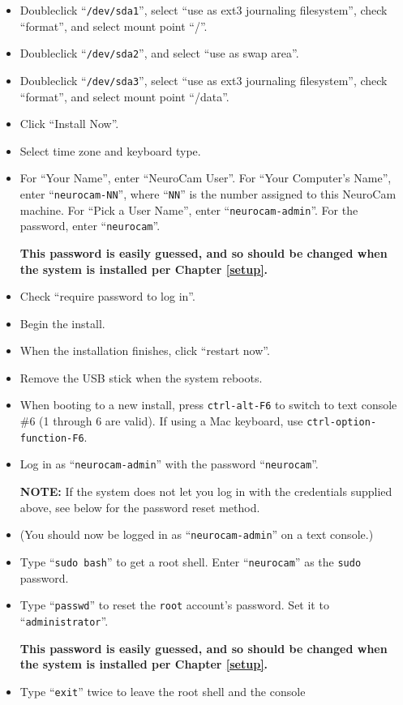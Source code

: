 \begin{itemize}
\item Doubleclick ``\verb+/dev/sda1+'', select ``use as ext3 journaling
filesystem'', check ``format'', and select mount point ``/''.
\item Doubleclick ``\verb+/dev/sda2+'', and select ``use as swap area''.
\item Doubleclick ``\verb+/dev/sda3+'', select ``use as ext3 journaling
filesystem'', check ``format'', and select mount point ``/data''.
\item Click ``Install Now''.
\item Select time zone and keyboard type.
\item For ``Your Name'', enter ``NeuroCam User''. For ``Your Computer's
Name'', enter ``\verb+neurocam-NN+'', where ``\verb+NN+'' is the number
assigned to this NeuroCam machine. For ``Pick a User Name'', enter
``\verb+neurocam-admin+''. For the password, enter ``\verb+neurocam+''.
\par
\textbf{This password is easily guessed, and so should be changed when the
system is installed per Chapter \ref{setup}.}
\item Check ``require password to log in''.
\item Begin the install.
\item When the installation finishes, click ``restart now''.
\item Remove the USB stick when the system reboots.
%
\item When booting to a new install, press \verb+ctrl-alt-F6+ to switch to
text console \#6 (1 through 6 are valid). If using a Mac keyboard, use
\verb+ctrl-option-function-F6+.
\item Log in as ``\verb+neurocam-admin+'' with the password
``\verb+neurocam+''.
\par
\textbf{NOTE:} If the system does not let you log in with the credentials
supplied above, see below for the password reset method.
%
\item (You should now be logged in as ``\verb+neurocam-admin+'' on a text
console.)
\item Type ``\verb+sudo bash+'' to get a root shell. Enter
``\verb+neurocam+'' as the \verb+sudo+ password.
\item Type ``\verb+passwd+'' to reset the \verb+root+ account's password.
Set it to ``\verb+administrator+''.
\par
\textbf{This password is easily guessed, and so should be changed when the
system is installed per Chapter \ref{setup}.}
\item Type ``\verb+exit+'' twice to leave the root shell and the console 

\end{itemize}
